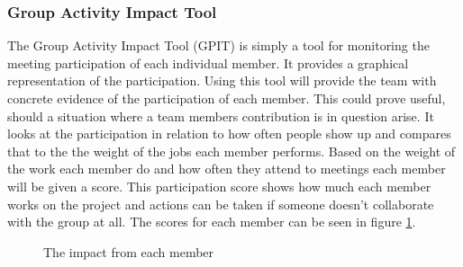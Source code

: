 \subsubsection{Group Activity Impact Tool}
The Group Activity Impact Tool (GPIT) is simply a tool for monitoring the meeting participation of each individual member. 
It provides a graphical representation of the participation. Using this tool will provide the team with concrete evidence of the participation of each member. 
This could prove useful, should a situation where a team members contribution is in question arise. 
It looks at the participation in relation to how often people show up and compares that to the the weight of the jobs each member performs.
Based on the weight of the work each member do and how often they attend to meetings each member will be given a score. 
This participation score shows how much each member works on the project and actions can be taken if someone doesn't collaborate with the group at all. 
The scores for each member can be seen in figure \ref{fig:GPITGraph}.



\begin{figure}[h!]
	\caption{The impact from each member}
	\label{fig:GPITGraph}
\end{figure}